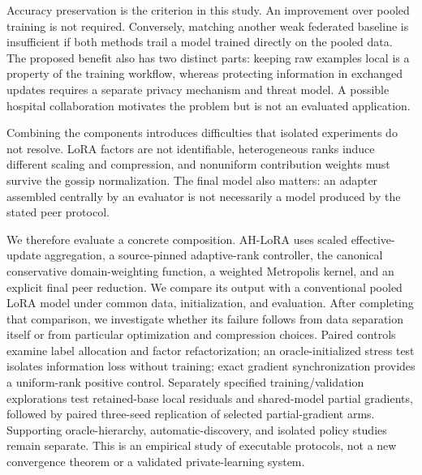 \documentclass[11pt]{article}
\begin{document}
Accuracy preservation is the criterion in this study. An improvement over pooled training is not required. Conversely, matching another weak federated baseline is insufficient if both methods trail a model trained directly on the pooled data. The proposed benefit also has two distinct parts: keeping raw examples local is a property of the training workflow, whereas protecting information in exchanged updates requires a separate privacy mechanism and threat model. A possible hospital collaboration motivates the problem but is not an evaluated application.

Combining the components introduces difficulties that isolated experiments do not resolve. LoRA factors are not identifiable, heterogeneous ranks induce different scaling and compression, and nonuniform contribution weights must survive the gossip normalization. The final model also matters: an adapter assembled centrally by an evaluator is not necessarily a model produced by the stated peer protocol.

We therefore evaluate a concrete composition. AH-LoRA uses scaled effective-update aggregation, a source-pinned adaptive-rank controller, the canonical conservative domain-weighting function, a weighted Metropolis kernel, and an explicit final peer reduction. We compare its output with a conventional pooled LoRA model under common data, initialization, and evaluation. After completing that comparison, we investigate whether its failure follows from data separation itself or from particular optimization and compression choices. Paired controls examine label allocation and factor refactorization; an oracle-initialized stress test isolates information loss without training; exact gradient synchronization provides a uniform-rank positive control. Separately specified training/validation explorations test retained-base local residuals and shared-model partial gradients, followed by paired three-seed replication of selected partial-gradient arms. Supporting oracle-hierarchy, automatic-discovery, and isolated policy studies remain separate. This is an empirical study of executable protocols, not a new convergence theorem or a validated private-learning system.
\end{document}
